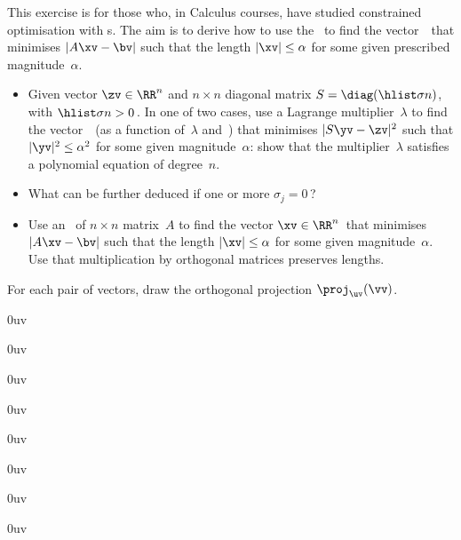 \begin{exercise} \label{ex:} 
This exercise is for those who, in Calculus courses, have studied constrained optimisation with s. 
The aim is to derive how to use the \svd\ to find the vector~\xv\ that minimises \(|A\xv-\bv|\) such that the length \(|\xv|\leq\alpha\) for some given prescribed magnitude~\(\alpha\).
\begin{itemize}
\item Given vector \(\zv\in\RR^n\) and \(n\times n\) diagonal matrix \(S=\diag(\hlist\sigma n)\), with \(\hlist\sigma n>0\)\,.
In one of two cases, use a Lagrange multiplier~\(\lambda\) to find the vector~\yv\ (as a function of~\(\lambda\) and~\zv) that minimises \(|S\yv-\zv|^2\) such that \(|\yv|^2\leq\alpha^2\) for some given magnitude~\(\alpha\): show that the multiplier~\(\lambda\) satisfies a polynomial equation of degree~\(n\).

\item What can be further deduced if one or more \(\sigma_j=0\)\,?

\item Use an \svd\ of \(n\times n\) matrix~\(A\) to find the vector \(\xv\in\RR^n\)\ that minimises \(|A\xv-\bv|\) such that the length \(|\xv|\leq\alpha\) for some given magnitude~\(\alpha\).
Use that multiplication by orthogonal matrices preserves lengths.
\end{itemize}
\end{exercise}






\begin{exercise} \label{ex:} 
For each pair of vectors, draw the orthogonal projection \(\proj_\uv(\vv)\).
\begin{parts}
\item {}0uv
\item {}0uv
\item {}0uv
\item {}0uv
\item {}0uv
\item {}0uv
\item {}0uv
\item {}0uv
\end{parts}
\end{exercise}




